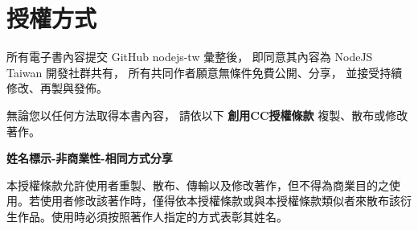 \documentclass[a4paper,12pt,english]{sphinxmanual}
\begin{document}
\section{授權方式}
\label{AUTHOR:id2}
所有電子書內容提交 GitHub nodejs-tw 彙整後，
即同意其內容為 NodeJS Taiwan 開發社群共有，
所有共同作者願意無條件免費公開、分享，
並接受持續修改、再製與發佈。

無論您以任何方法取得本書內容，
請依以下 \textbf{創用CC授權條款} 複製、散布或修改著作。

\textbf{姓名標示-非商業性-相同方式分享}

本授權條款允許使用者重製、散布、傳輸以及修改著作，但不得為商業目的之使用。若使用者修改該著作時，僅得依本授權條款或與本授權條款類似者來散布該衍生作品。使用時必須按照著作人指定的方式表彰其姓名。



\renewcommand{\indexname}{Index}
\printindex
\end{document}
